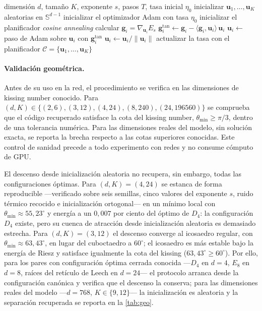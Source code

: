 \documentclass[11pt,a4paper]{article}
\theoremstyle{plain}
\newcommand{\Sph}{\mathbb{S}}
\begin{document}
\begin{algorithm}[t]
\caption{Generación de un código esférico por descenso proyectado}
\label{alg:codes}
\begin{algorithmic}[1]
\Require dimensión $d$, tamaño $K$, exponente $s$, pasos $T$, tasa
inicial $\eta_0$
\State inicializar $\bm{u}_1,\dots,\bm{u}_K$ aleatorias en $\Sph^{d-1}$
\State inicializar el optimizador Adam con tasa $\eta_0$
\State inicializar el planificador \emph{cosine annealing}
  \State calcular $\bm{g}_i = \nabla_{\bm{u}_i} E_s$
  \State $\bm{g}_i^{\mathrm{tan}}
         \gets \bm{g}_i - \langle\bm{g}_i,\bm{u}_i\rangle\,\bm{u}_i$
  \State $\bm{u}_i \gets$ paso de Adam sobre $\bm{u}_i$
         con $\bm{g}_i^{\mathrm{tan}}$
  \State $\bm{u}_i \gets \bm{u}_i / \lVert\bm{u}_i\rVert$
  \State actualizar la tasa con el planificador
\EndFor
\State \Return $\mathcal{C}=\{\bm{u}_1,\dots,\bm{u}_K\}$
\end{algorithmic}
\end{algorithm}

\paragraph{Validación geométrica.} Antes de su uso en la red, el
procedimiento se verifica en las dimensiones de kissing number conocido.
Para $(d,K)\in\{(2,6),(3,12),(4,24),(8,240),(24,196560)\}$ se comprueba
que el código recuperado satisface la cota del kissing number,
$\theta_{\min}\ge\pi/3$, dentro de una tolerancia numérica. Para las
dimensiones reales del modelo, sin solución exacta, se reporta la brecha
respecto a las cotas superiores conocidas. Este control de sanidad
precede a todo experimento con redes y no consume cómputo de GPU.

El descenso desde inicialización aleatoria no recupera, sin embargo,
todas las configuraciones óptimas. Para $(d,K){=}(4,24)$ se estanca de
forma reproducible ---verificado sobre seis semillas, cinco valores del
exponente $s$, ruido térmico recocido e inicialización ortogonal--- en
un mínimo local con $\theta_{\min}\approx55{,}23^\circ$ y energía a un
$0{,}007$ por ciento del óptimo de $D_4$: la configuración $D_4$ existe, pero
su cuenca de atracción desde inicialización aleatoria es demasiado
estrecha. Para $(d,K){=}(3,12)$ el descenso converge al icosaedro
regular, con $\theta_{\min}\approx63{,}43^\circ$, en lugar del
cuboctaedro a $60^\circ$; el icosaedro es más estable bajo la energía
de Riesz y satisface igualmente la cota del kissing
($63{,}43^\circ\ge60^\circ$). Por ello, para los pares con
configuración óptima cerrada conocida ---$D_4$ en $d{=}4$, $E_8$ en
$d{=}8$, raíces del retículo de Leech en $d{=}24$--- el protocolo
arranca desde la configuración canónica y verifica que el descenso la
conserva; para las dimensiones reales del modelo ---$d{=}768$,
$K\in\{9,12\}$--- la inicialización es aleatoria y la separación
recuperada se reporta en la \cref{tab:geo}.
\end{document}

